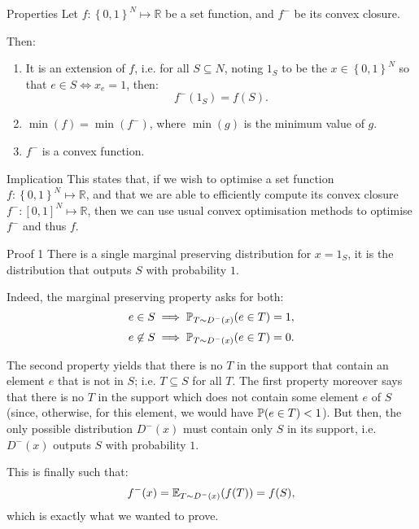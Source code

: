 \documentclass[a4paper]{article}
\begin{document}
\begin{parag}{Properties}
    Let $f: \left\{0, 1\right\}^N \mapsto \mathbb{R}$ be a set function, and $f^-$ be its convex closure.

    Then:
    \begin{enumerate}
        \item It is an extension of $f$, i.e. for all $S \subseteq N$, noting $1_S$ to be the $x \in \left\{0, 1\right\}^N$ so that $e \in S \iff x_e = 1$, then:
        \[f^-\left(1_S\right) = f\left(S\right).\]
        
        \item $\min\left(f\right) = \min\left(f^-\right)$, where $\min\left(g\right)$ is the minimum value of $g$.
        \item $f^-$ is a convex function.
    \end{enumerate}

    \begin{subparag}{Implication}
        This states that, if we wish to optimise a set function $f: \left\{0, 1\right\}^N \mapsto \mathbb{R}$, and that we are able to efficiently compute its convex closure $f^-: \left[0, 1\right]^N \mapsto \mathbb{R}$, then we can use usual convex optimisation methods to optimise $f^-$ and thus $f$.
    \end{subparag}
    
    \begin{subparag}{Proof 1}
        There is a single marginal preserving distribution for $x = 1_S$, it is the distribution that outputs $S$ with probability $1$.

        Indeed, the marginal preserving property asks for both:
        \[e \in S \implies \prob_{T \followsdistr D^-\left(x\right)}\left(e \in T\right) = 1,\]
        \[e \not \in S \implies \prob_{T \followsdistr D^-\left(x\right)}\left(e \in T\right) = 0.\]

        The second property yields that there is no $T$ in the support that contain an element $e$ that is not in $S$; i.e. $T \subseteq S$ for all $T$. The first property moreover says that there is no $T$ in the support which does not contain some element $e$ of $S$ (since, otherwise, for this element, we would have $\prob\left(e \in T\right) < 1$). But then, the only possible distribution $D^-\left(x\right)$ must contain only $S$ in its support, i.e. $D^-\left(x\right)$ outputs $S$ with probability $1$.

        This is finally such that: 
        \[f^-\left(x\right) = \exval_{T \followsdistr D^-\left(x\right)}\left(f\left(T\right)\right) = f\left(S\right),\]
        which is exactly what we wanted to prove.
    \end{subparag}


\end{parag}
\end{document}
